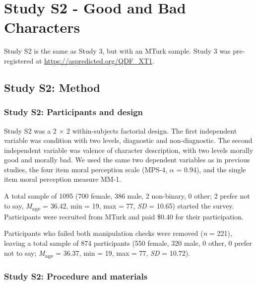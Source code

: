 \documentclass[
  man,floatsintext]{apa6}
\begin{document}
\newpage

\newpage

\pagebreak

\section{Study S2 - Good and Bad Characters}\label{study-s2---good-and-bad-characters}

Study S2 is the same as Study 3, but with an MTurk sample. Study 3 was pre-registered at \color{blue}\url{https://aspredicted.org/QDF_XT1}\color{black}.

\subsection{Study S2: Method}\label{study-s2-method}

\subsubsection{Study S2: Participants and design}\label{study-s2-participants-and-design}

Study S2 was a 2 \(\times\) 2 within-subjects factorial design. The first independent variable was condition with two levels, diagnostic and non-diagnostic. The second independent variable was valence of character description, with two levels morally good and morally bad. We used the same two dependent variables as in previous studies, the four item moral perception scale (MPS-4, \(\alpha\) = 0.94), and the single item moral perception measure MM-1.

A total sample of 1095 (700 female, 386 male, 2 non-binary, 0 other; 2 prefer not to say, \emph{M}\textsubscript{age} = 36.42, min = 19, max = 77, \emph{SD} = 10.65) started the survey. Participants were recruited from MTurk and paid \$0.40 for their participation.

Participants who failed both manipulation checks were removed (\emph{n} = 221), leaving a total sample of 874 participants (550 female, 320 male, 0 other, 0 prefer not to say; \emph{M}\textsubscript{age} = 36.37, min = 19, max = 77, \emph{SD} = 10.72).

\subsubsection{Study S2: Procedure and materials}\label{study-s2-procedure-and-materials}
\end{document}
